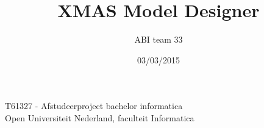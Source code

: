 \documentclass[a4paper,11pt,final]{article}
\author{ABI team 33}
\date{03/03/2015}
\title{\color{blue}XMAS Model Designer}
\begin{document}


\nowidow%

\newcommand{\xmas}{x\textsc{mas}}%
\newcommand{\ok}{$\checkmark$}
\newcommand{\w}[1]{\textbf{\textsc{#1}}}
\newcommand\bw[1]{{\color{blue}#1}}

\newcommand{\mybox}[1]{\begin{boxedminipage}[t]{\textwidth}#1\end{boxedminipage}}



\newcommand\smp[1]{%
	\marginpar{\color{blue}\small\bf\textsc#1}
}%
\newcommand\smpp[1]{\smp{#1}#1}


\maketitle
\begin{center}
	T61327 - Afstudeerproject bachelor informatica
	\\ \hfill\break
	Open Universiteit Nederland, faculteit Informatica
	\\ \hfill\break
\end{center}
\end{document}
